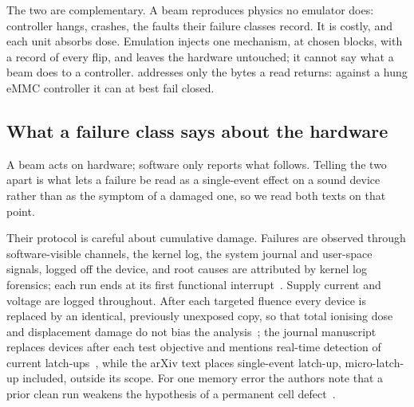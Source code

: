 The two are complementary. A beam reproduces physics no emulator does:
controller hangs, crashes, the faults their failure classes record. It
is costly, and each unit absorbs dose. Emulation injects one mechanism,
at chosen blocks, with a record of every flip, and leaves the hardware
untouched; it cannot say what a beam does to a controller. \bfs
addresses only the bytes a read returns: against a hung eMMC controller
it can at best fail closed.

\subsection{What a failure class says about the hardware}

A beam acts on hardware; software only reports what follows. Telling
the two apart is what lets a failure be read as a single-event effect on
a sound device rather than as the symptom of a damaged one, so we read
both texts on that point.

Their protocol is careful about cumulative damage. Failures are observed
through software-visible channels, the kernel log, the system journal
and user-space signals, logged off the device, and root causes are
attributed by kernel log forensics; each run ends at its first
functional interrupt~\cite{memon2025arxiv}. Supply current and voltage
are logged throughout. After each targeted fluence every device is
replaced by an identical, previously unexposed copy, so that total
ionising dose and displacement damage do not bias the
analysis~\cite{memon2025arxiv}; the journal manuscript replaces devices
after each test objective and mentions real-time detection of current
latch-ups~\cite{memon2025tr}, while the arXiv text places single-event
latch-up, micro-latch-up included, outside its scope. For one memory
error the authors note that a prior clean run weakens the hypothesis of
a permanent cell defect~\cite{memon2025arxiv}.

